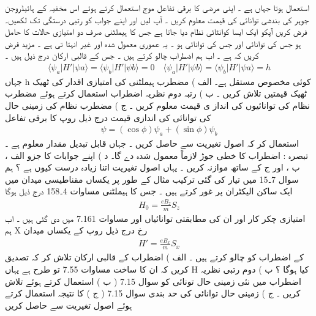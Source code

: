  استعمال ہوتا جہاں  ہے ۔ اپنی مرضی کا برقی تفاعل موج استعمال کرتے ہوئے اس مخفیہ کے ہائیڈروجن  جوہر کی بندشی توانائی کی قیمت معلوم کریں ۔ آپ  لیں اور اپنے جواب کو  رتبی درستگی تک لکھیں۔
فرض کریں آپکو ایک ایسا کوانٹائی نظام دیا جاتا ہے جس کا ہیملٹنی  صرف دو امتیازی حالات کا حامل ہو  جس کی توانائی  اور  جس کی توانائی  ہو ۔ یہ عموری معمول شدہ اور غیر انہتا تی ہے ۔ مزید فرض کریں کہ  ہے ۔ اب ہم اضطراب  چالو کرتے ہیں ۔ جس کے قالبی ارکان درج ذیل ہیں ۔
\begin{align}
\langle \psi_{a}|H'|\psi{a}\rangle=\langle \psi_{b}|H'|\psi{b}\rangle=0\quad \langle \psi_{a}|H'|\psi{b}\rangle=\langle \psi_{b}|H'|\psi{a}\rangle=h
\end{align}
 جہاں h کوئی مخصوص مستقل ہے۔
الف ) مضطرب ہیملٹنی کی امتیازی اقدار کی ٹھیک ٹھیک قیمتیں تلاش کریں ۔
ب ) رتبہ دوم نظریہ اضطراب استعمال کرتے ہوئے مضطرب نظام کی توانائیوں کی انداز ی قیمت معلوم کریں ۔
ج ) مضطرب نظام کی زمینی حال کی توانائی کی اندازی قیمت درج ذیل روپ کا برقی تفاعل
\begin{align}
\psi=(\cos{\phi})\psi_{a}+(\sin{\phi})\psi_{b} 
\end{align}
 استعمال کر کہ اصول تغیریت سے حاصل کریں ۔ جہاں  قابل تبدیل مقدار معلوم ہے ۔
تبصرہ : اضطراب کا خطی جوڑ لازماً معمول شدہ دے گا۔
د ) اپنے جوابات کا جزو الف ، ب ، اور ج کے ساتھ موازنہ کریں ۔ یہاں اصول تغیریت اتنا زیادہ درست کیوں ہے ؟
ہم سوال 7۔15 میں تیار کی گئی ترکیب مثال کے طور پر یکساں مقناطیسی میدان  میں ایک ساکن الیکٹران پر غور کرتے ہیں ۔ جس کا ہیملٹنی مساوات 4۔158 درج ذیل ہوگا
\begin{align}
H_{0}=\frac{eB_{z}}{m}S_{z} 
\end{align}
 امتیازی چکر کار  اور  ان کی مطابقتی توانائیاں  اور  مساوات 7.161 میں دی گئی ہیں ۔
اب ہم X رخ درج ذیل روپ کے یکساں میدان
\begin{align}
H'=\frac{eB_{x}}{m}S_{x} 
\end{align}
 کے اضطراب کو چالو کرتے ہیں ۔
الف ) اضطراب  کے قالبی ارکان تلاش کر کہ تصدیق کریں کہ ان کا ساخت مساوات 7.55 تو طرح ہے یہاں H کیا ہوگا ؟
ب ) دوم رتبی نظریہ اضطراب میں نئی زمینی حال تونائی کو سوال 7.15 ( ب ) استعمال کرتے ہوئے تلاش کریں ۔
ج ) زمینی حال توانائی کی حد بندی سوال 7.15 ( ج ) کا نتیجہ استعمال کرتے ہوئے اصول تغیریت سے حاصل کریں
